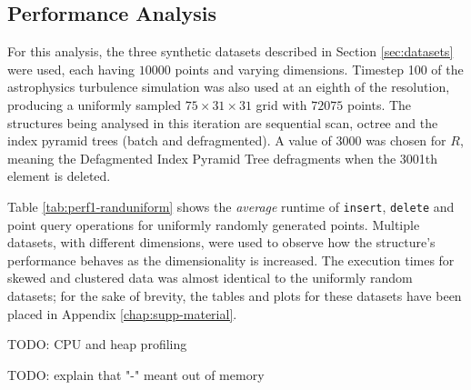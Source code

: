 \subsection{Performance Analysis}

For this analysis, the three synthetic datasets described in Section \ref{sec:datasets} were used, each having $10000$ points and varying dimensions. Timestep 100 of the astrophysics turbulence simulation was also used at an eighth of the resolution, producing a uniformly sampled $75 \times 31 \times 31$ grid with $72075$ points. The structures being analysed in this iteration are sequential scan, octree and the index pyramid trees (batch and defragmented). A value of 3000 was chosen for $R$, meaning the Defagmented Index Pyramid Tree defragments when the 3001th element is deleted.

Table \ref{tab:perf1-randuniform} shows the \textit{average} runtime of \texttt{insert}, \texttt{delete} and point query operations for uniformly randomly generated points. Multiple datasets, with different dimensions, were used to observe how the structure's performance behaves as the dimensionality is increased. The execution times for skewed and clustered data was almost identical to the uniformly random datasets; for the sake of brevity, the tables and plots for these datasets have been placed in Appendix \ref{chap:supp-material}.

TODO: CPU and heap profiling

TODO: explain that "-" meant out of memory

